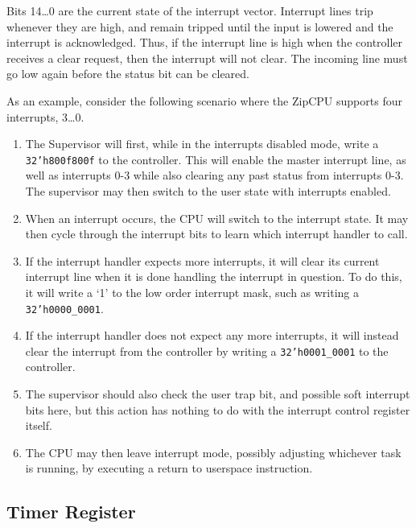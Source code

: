 \documentclass{gqtekspec}
\begin{document}
Bits 14\ldots 0 are the current state of the interrupt vector.  Interrupt lines
trip whenever they are high, and remain tripped until the input is lowered and
the interrupt is acknowledged.  Thus, if the interrupt line is high when the
controller receives a clear request, then the interrupt will not clear.
The incoming line must go low again before the status bit can be cleared.

As an example, consider the following scenario where the ZipCPU supports four
interrupts, 3\ldots0.
\begin{enumerate}
\item The Supervisor will first, while in the interrupts disabled mode,
	write a {\tt 32'h800f800f} to the controller.  This will enable the
	master interrupt line, as well as interrupts 0-3 while also clearing any
	past status from interrupts 0-3.  The supervisor may then
	switch to the user state with interrupts enabled.
\item When an interrupt occurs, the CPU will switch to the interrupt
	state.  It may then cycle through the interrupt bits to learn which
	interrupt handler to call.
\item If the interrupt handler expects more interrupts, it will clear its
	current interrupt line when it is done handling the interrupt in
	question.  To do this, it will write a `1' to the low order interrupt
	mask, such as writing a {\tt 32'h0000\_0001}.
\item If the interrupt handler does not expect any more interrupts, it will
	instead clear the interrupt from the controller by writing a 
	{\tt 32'h0001\_0001} to the controller.
\item The supervisor should also check the user trap bit, and possible soft
	interrupt bits here, but this action has nothing to do with the
	interrupt control register itself.
\item The CPU may then leave interrupt mode, possibly adjusting
	whichever task is running, by executing a return to userspace
	instruction.
\end{enumerate}

\subsection{Timer Register}\label{sec:reg-timer}
\end{document}
